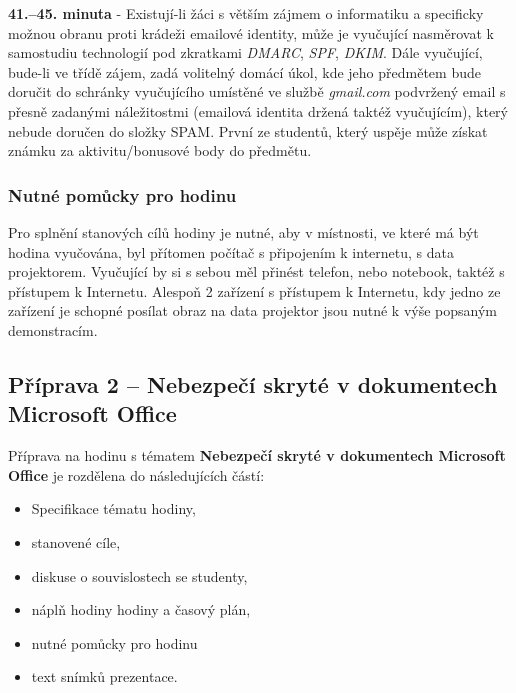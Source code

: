 \documentclass[a4paper, 12pt]{article}
\begin{document}
\textbf{41.--45. minuta} - Existují-li žáci s větším zájmem o informatiku a specificky možnou obranu proti krádeži emailové identity, může je vyučující nasměrovat k samostudiu technologií pod zkratkami \textit{DMARC}, \textit{SPF}, \textit{DKIM}. Dále vyučující, bude-li ve třídě zájem, zadá volitelný domácí úkol, kde jeho předmětem bude doručit do schránky vyučujícího umístěné ve službě \textit{gmail.com} podvržený email s přesně zadanými náležitostmi (emailová identita držená taktéž vyučujícím), který nebude doručen do složky SPAM. První ze studentů, který uspěje může získat známku za aktivitu/bonusové body do předmětu.

\subsubsection{Nutné pomůcky pro hodinu}
Pro splnění stanových cílů hodiny je nutné, aby v místnosti, ve které má být hodina vyučována, byl přítomen počítač s připojením k internetu, s data projektorem. Vyučující by si s sebou měl přinést telefon, nebo notebook, taktéž s přístupem k Internetu. Alespoň 2 zařízení s přístupem k Internetu, kdy jedno ze zařízení je schopné posílat obraz na data projektor jsou nutné k výše popsaným demonstracím.



\subsection{Příprava 2 -- Nebezpečí skryté v dokumentech Microsoft Office}
Příprava na hodinu s tématem \textbf{Nebezpečí skryté v dokumentech Microsoft Office} je rozdělena do následujících částí:
    \begin{itemize}
        \setlength{\itemsep}{-3pt}
        \item Specifikace tématu hodiny,
        \item stanovené cíle,
        \item diskuse o souvislostech se studenty,
        \item náplň hodiny hodiny a časový plán,
        \item nutné pomůcky pro hodinu
        \item text snímků prezentace.
    \end{itemize}
\end{document}
